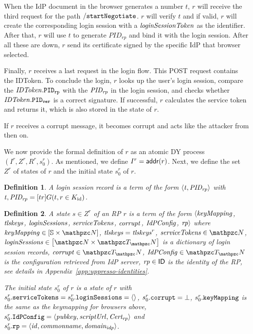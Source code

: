 \documentclass[letterpaper,onecolumn,10pt]{article}
\newtheorem{definition}{Definition}
\begin{document}
When the IdP document in the browser generates a number $t$,
$r$ will receive the third request for the path $\mathtt{/startNegotiate}$.
$r$ will verify $t$ and if valid, $r$ will create the corresponding 
login session with a $\mathit{loginSessionToken}$ as the identifier. After that,
$r$ will use $t$ to generate $PID_{rp}$ and bind it with the login session.
After all these are down, $r$ send its certificate signed by the specific IdP that browser selected.

Finally, $r$ receives a last request in the login flow. This POST request 
contains the IDToken. To conclude the login, $r$ looks up the user's login session, 
compare the $\mathit{IDToken}.\mathtt{PID_{rp}}$ with the $\mathit{PID_{rp}}$ in the login session, and checks 
whether $\mathit{IDToken}.\mathtt{PID_{ver}}$ is a correct signature. If successful, $r$ calculates the 
service token and returns it, which is also stored in the state of $r$.

If $r$ receives a corrupt message, it becomes corrupt and acts like
the attacker from then on.

We now provide the formal definition of $r$ as an atomic DY process
$(I^r, Z^r, R^r, s^r_0)$. As mentioned, we define $I^r =
\mathsf{addr}(r)$. Next, we define the set $Z^r$ of states of
$r$ and the initial state $s^r_0$ of $r$.

\begin{definition}
  A \emph{login session record} is a term of the form 
  $\langle\mathit{t}, \mathit{PID_{rp}}\rangle$ with 
  $\mathit{t}, \mathit{PID_{rp}}=[tr]G(t,r\in K_{\text{id}})$.
\end{definition}

\begin{sloppypar}
  \begin{definition}\label{def:relying-parties}
    A \emph{state $s\in Z^r$ of an RP $r$} is a term of the form
    $\langle\mathit{keyMapping}$, 
    $\mathit{tlskeys}$, 
    $\mathit{loginSessions}$, 
    $\mathit{serviceTokens}$, 
    $\mathit{corrupt}$, 
    $\mathit{IdPConfig}$, 
    $\mathit{rp}\rangle$ where 
    $\mi{keyMapping} \in \dict{\mathbb{S}}{\nonces}$,
    $\mathit{tlskeys}=\mathit{tlskeys}^r$,
    $\mi{serviceTokens} \in \nonces$,
    $\mi{loginSessions} \in \dict{\nonces}{\terms}$ 
    is a dictionary of login session records,
    $\mi{corrupt} \in \terms$,
    $\mi{IdPConfig} \in \terms$ 
    is the configuration retrieved from IdP server,
    $\mathit{rp} \in \mathsf{ID}$ is the identity of the RP, 
    see details in Appendix~\ref{app:uppresso-identities}.

    The \emph{initial state $s^r_0$ of $r$} is a state of 
    $r$ with $s^r_0.\mathtt{serviceTokens} = 
    s^r_0.\mathtt{loginSessions} = \langle\rangle$,
    $s^r_0.\mathtt{corrupt} = \bot$, 
    $s^r_0.\mathtt{keyMapping}$ 
    is the same as the keymapping for browsers above,
    $s^r_0.\mathtt{IdPConfig} = \langle\mathit{pubkey},\mathit{scriptUrl},\mathit{Cert_{rp}}\rangle$ and
    $s^r_0.\mathtt{rp} = \langle\mathit{id},\mathit{commonname},\mathit{domain_{idp}}\rangle$.
  \end{definition}
\end{sloppypar}
\end{document}
